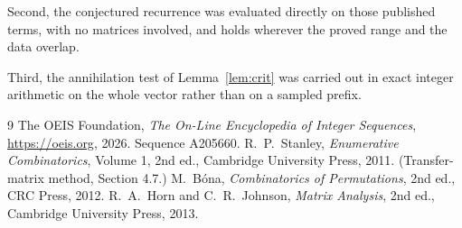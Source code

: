 \documentclass[11pt,a4paper]{article}
\theoremstyle{plain}
\theoremstyle{definition}
\begin{document}
Second, the conjectured recurrence was evaluated directly on those published terms, with no
matrices involved, and holds wherever the proved range and the data overlap.

Third, the annihilation test of Lemma~\ref{lem:crit} was carried out in exact integer
arithmetic on the whole vector rather than on a sampled prefix.

\begin{thebibliography}{9}
 The OEIS Foundation, \emph{The On-Line Encyclopedia of Integer
Sequences}, \url{https://oeis.org}, 2026. Sequence A205660.
 R.~P.~Stanley, \emph{Enumerative Combinatorics}, Volume 1, 2nd ed.,
Cambridge University Press, 2011. (Transfer-matrix method, Section 4.7.)
 M.~B\'ona, \emph{Combinatorics of Permutations}, 2nd ed., CRC
Press, 2012.
 R.~A.~Horn and C.~R.~Johnson, \emph{Matrix Analysis}, 2nd ed., Cambridge
University Press, 2013.
\end{thebibliography}
\end{document}
